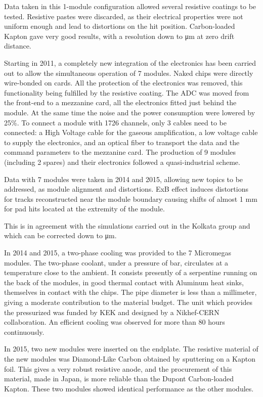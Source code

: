 Data taken in this 1-module configuration allowed several resistive coatings to be tested. Resistive pastes were discarded, as
their electrical properties were not uniform enough and lead to distortions on the hit position. Carbon-loaded Kapton gave
very good results, with a resolution down to \unit[70]{\micro m} at zero drift distance.

Starting in 2011, a completely new integration of the electronics has been carried out to allow the simultaneous operation
of 7 modules. Naked chips were directly wire-bonded on cards. All the protection of the electronics was removed, this functionality
being fulfilled by the resistive coating. The ADC was moved from the front-end to a mezzanine card, all the electronics fitted just behind the module.
At the same time the noise and the power consumption were lowered by 25\%. To connect a module with 1726 channels, only
3 cables need to be connected: a High Voltage cable for the gaseous amplification, a low voltage cable to supply the electronics,
and an optical fiber to transport the data and the command parameters to the mezzanine card.
The production of 9 modules (including 2 spares) and their electronics followed a quasi-industrial scheme.

Data with 7 modules were taken in 2014 and 2015, allowing new topics to be addressed, as module alignment and distortions.
ExB effect induces distortions for tracks reconstructed near the module boundary causing
shifts of almost 1 mm for pad hits located at the extremity of the module.


This is
in agreement with the simulations carried out in the Kolkata group and which can be corrected down to \unit[20]{\micro m}.

In 2014 and 2015, a two-phase  cooling was provided to the 7 Micromegas modules. The two-phase coolant, under a pressure of \unit[50]{bar}, circulates at a temperature close to the ambient.
It consists presently of a serpentine running on the back of the modules, in good thermal contact with Aluminum heat sinks, themselves in contact with the chips. The pipe diameter is less than a millimeter, giving a moderate contribution to the material budget. The unit
which provides the pressurized  was funded by KEK and designed by a Nikhef-CERN collaboration.
An efficient cooling was observed for more than 80 hours continuously.

In 2015, two new modules were inserted on the endplate. The resistive material of the new
modules was Diamond-Like Carbon obtained by sputtering on a Kapton foil.
This gives a very robust resistive anode, and the procurement of this material, made in Japan, is more reliable
than the Dupont Carbon-loaded Kapton. These two modules showed identical performance as the other modules.

